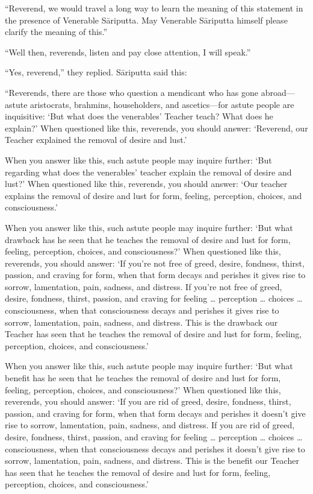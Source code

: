 \documentclass[12pt,openany]{book}%
\begin{document}
“Reverend, we would travel a long way to learn the meaning of this statement in the presence of Venerable \textsanskrit{Sāriputta}. May Venerable \textsanskrit{Sāriputta} himself please clarify the meaning of this.” 

“Well then, reverends, listen and pay close attention, I will speak.” 

“Yes, reverend,” they replied. \textsanskrit{Sāriputta} said this: 

“Reverends, there are those who question a mendicant who has gone abroad—astute aristocrats, brahmins, householders, and ascetics—for astute people are inquisitive: ‘But what does the venerables’ Teacher teach? What does he explain?’ When questioned like this, reverends, you should answer: ‘Reverend, our Teacher explained the removal of desire and lust.’ 

When you answer like this, such astute people may inquire further: ‘But regarding what does the venerables’ teacher explain the removal of desire and lust?’ When questioned like this, reverends, you should answer: ‘Our teacher explains the removal of desire and lust for form, feeling, perception, choices, and consciousness.’ 

When you answer like this, such astute people may inquire further: ‘But what drawback has he seen that he teaches the removal of desire and lust for form, feeling, perception, choices, and consciousness?’ When questioned like this, reverends, you should answer: ‘If you’re not free of greed, desire, fondness, thirst, passion, and craving for form, when that form decays and perishes it gives rise to sorrow, lamentation, pain, sadness, and distress. If you’re not free of greed, desire, fondness, thirst, passion, and craving for feeling … perception … choices … consciousness, when that consciousness decays and perishes it gives rise to sorrow, lamentation, pain, sadness, and distress. This is the drawback our Teacher has seen that he teaches the removal of desire and lust for form, feeling, perception, choices, and consciousness.’ 

When you answer like this, such astute people may inquire further: ‘But what benefit has he seen that he teaches the removal of desire and lust for form, feeling, perception, choices, and consciousness?’ When questioned like this, reverends, you should answer: ‘If you are rid of greed, desire, fondness, thirst, passion, and craving for form, when that form decays and perishes it doesn’t give rise to sorrow, lamentation, pain, sadness, and distress. If you are rid of greed, desire, fondness, thirst, passion, and craving for feeling … perception … choices … consciousness, when that consciousness decays and perishes it doesn’t give rise to sorrow, lamentation, pain, sadness, and distress. This is the benefit our Teacher has seen that he teaches the removal of desire and lust for form, feeling, perception, choices, and consciousness.’ 
\end{document}
